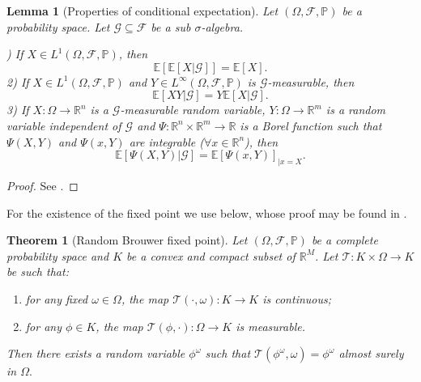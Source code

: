 \documentclass[a4paper,10pt,reqno]{article}
\theoremstyle{definition}
\theoremstyle{plain}
\newtheorem{theorem}[definition]{Theorem}
\theoremstyle{plain}
\theoremstyle{definition}
\theoremstyle{plain}
\theoremstyle{plain}
\theoremstyle{plain}
\newtheorem{lemma}[definition]{Lemma}
\theoremstyle{definition}
\theoremstyle{definition}
\def \R{\mathbb R}
\def \P{{\mathbb P}}
\def \E{\mathbb{E}}
\begin{document}
\begin{lemma}[Properties of conditional expectation] \label{lemma: properties of conditional expectation}
Let $(\mathbb{\Omega}, \mathcal{F},\P)$ be a probability space.
Let $\mathcal{G} \subseteq \mathcal{F}$ be a sub $\sigma$-algebra.

) If $X \in L^1(\mathbb{\Omega},\mathcal{F},\P)$, then
\begin{equation} \label{tower property}
\E \left [ \E \left [ X \lvert \mathcal{G} \right ] \right ] = \E \left [ X \right ].
\end{equation}
2) If $X \in L^1(\mathbb{\Omega},\mathcal{F},\P)$ and $Y \in L^{\infty}(\mathbb{\Omega},\mathcal{F},\P)$ is $\mathcal{G}$-measurable, then
\begin{equation} \label{take out what is known}
\E \left [ XY \lvert \mathcal{G} \right ] = Y \E \left [ X \lvert \mathcal{G} \right ].
\end{equation}
3) If $X : \mathbb{\Omega} \rightarrow \R^n$ is a $\mathcal{G}$-measurable random variable, $Y : \mathbb{\Omega} \rightarrow \R^m$ is a random variable independent of $\mathcal{G}$ 
and $\Psi : \R^n \times \R^m \rightarrow \R$ is a Borel function such that $\Psi(X,Y)$ and $\Psi(x,Y)$ are integrable ($\forall x \in \R^n$), then
\begin{equation} \label{eq: resnick}
\E \left [ \Psi(X,Y) \lvert \mathcal{G} \right ] = \E \left [ \Psi(x,Y) \right ]_{\lvert x=X}.
\end{equation}
\end{lemma}
\begin{proof}
See \cite[Chapter 10]{resnick}.
\end{proof}

For the existence of the fixed point we use  below, whose proof may be found in \cite[Theorem~10]{fixed point}.

\begin{theorem}[Random Brouwer fixed point] \label{thm: random fixed point}
Let $(\mathbb{\Omega} , \mathcal{F} , \P )$ be a complete probability space and $K$ be a convex and compact subset of $\R^M$.
Let $\mathcal{T} : K \times \mathbb{\Omega}  \longrightarrow K$ be such that:
\begin{enumerate}
    \item for any fixed $\omega \in \mathbb{\Omega}$, the map $\mathcal{T}(\cdot,\omega) : K \longrightarrow K$ is continuous;
    \item for any $\phi \in K$, the map $\mathcal{T}(\phi,\cdot) : \mathbb{\Omega} \longrightarrow K$ is measurable.
\end{enumerate}
Then there exists a random variable $\phi^{\omega}$ such that $\mathcal{T}(\phi^{\omega},\omega) = \phi^{\omega}$ almost surely in $\mathbb{\Omega}.$
\end{theorem}
\end{document}
